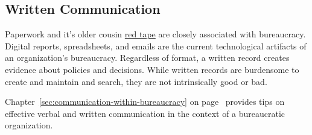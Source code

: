 \subsection*{Written Communication\label{sec:written-communication}}

Paperwork and it's older cousin \href{https://en.wikipedia.org/wiki/Red_tape}{red tape} are closely associated with bureaucracy.
Digital reports, spreadsheets, and emails are the current technological artifacts of an organization's bureaucracy. Regardless of format, a written record creates evidence about policies and decisions. %
While written records are burdensome to create and maintain and search, they are not intrinsically good or bad. 

Chapter~\ref{sec:communication-within-bureaucracy} on page~\pageref{sec:communication-within-bureaucracy} provides tips on effective verbal and written communication in the context of a bureaucratic organization. 